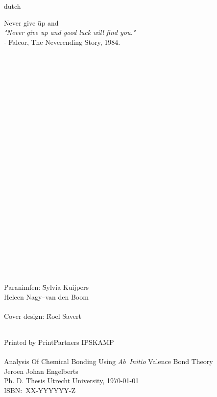 \begin{otherlanguage*}{dutch}
\newpage
\raggedright
\noindent
\begin{tabbing}
Never give \= up and \kill\\
\textit{"Never give up and good luck will find you."}\\
\> - Falcor, The Neverending Story, 1984.
\end{tabbing}
\mbox{ }\\
\mbox{ }\\
\mbox{ }\\
\mbox{ }\\
\mbox{ }\\
\mbox{ }\\
\mbox{ }\\
\mbox{ }\\
\mbox{ }\\
\mbox{ }\\
\mbox{ }\\
\mbox{ }\\
\mbox{ }\\
\mbox{ }\\
\mbox{ }\\
\mbox{ }\\
\mbox{ }\\
\mbox{ }\\
\mbox{ }\\
\mbox{ }\\
\mbox{ }\\
\mbox{ }\\
\mbox{ }\\
\begin{tabbing}
Paranimfen: \=Sylvia Kuijpers\\
            \>Heleen Nagy--van den Boom\\
\\
Cover design: \=Roel Savert\\
\end{tabbing}
\end{otherlanguage*}
\mbox{ }\\
Printed by PrintPartners IPSKAMP\\
\mbox{ }\\
Analysis Of Chemical Bonding Using \textit{Ab~Initio} Valence Bond Theory\\
Jeroen Johan Engelberts\\
Ph. D. Thesis Utrecht University, \today \\
ISBN:~XX-YYYYYY-Z
\newpage

\tableofcontents

\mainmatter \pagestyle{fancy}

